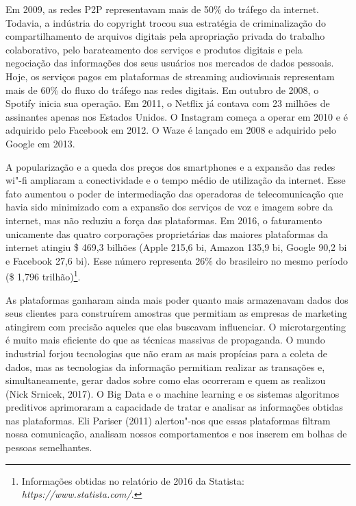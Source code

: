 Em 2009, as redes P2P representavam mais de 50\% do tráfego da internet.
Todavia, a indústria do copyright trocou sua estratégia de
criminalização do compartilhamento de arquivos digitais pela apropriação
privada do trabalho colaborativo, pelo barateamento dos serviços e
produtos digitais e pela negociação das informações dos seus usuários
nos mercados de dados pessoais. Hoje, os serviços pagos em plataformas
de streaming audiovisuais representam mais de 60\% do fluxo do tráfego
nas redes digitais. Em outubro de 2008, o Spotify inicia sua operação.
Em 2011, o Netflix já contava com 23 milhões de assinantes apenas nos
Estados Unidos. O Instagram começa a operar em 2010 e é adquirido pelo
Facebook em 2012. O Waze é lançado em 2008 e adquirido pelo Google em
2013.

A popularização e a queda dos preços dos smartphones e a expansão das
redes wi"-fi ampliaram a conectividade e o tempo médio de utilização da
internet. Esse fato aumentou o poder de intermediação das operadoras de
telecomunicação que havia sido minimizado com a expansão dos serviços de
voz e imagem sobre  da internet, mas não reduziu a força das
plataformas. Em 2016, o faturamento unicamente das quatro corporações
proprietárias das maiores plataformas da internet atingiu \$ 469,3
bilhões (Apple 215,6 bi, Amazon 135,9 bi, Google 90,2 bi e Facebook 27,6
bi). Esse número representa 26\% do  brasileiro no mesmo período
(\$ 1,796 trilhão)\footnote{Informações obtidas no relatório de 2016
  da Statista: \emph{https://www.statista.com/}.}.

As plataformas ganharam ainda mais poder quanto mais armazenavam dados
dos seus clientes para construírem amostras que permitiam as empresas de
marketing atingirem com precisão aqueles que elas buscavam influenciar.
O microtargenting é muito mais eficiente do que as técnicas massivas de
propaganda. O mundo industrial forjou tecnologias que não eram as mais
propícias para a coleta de dados, mas as tecnologias da informação
permitiam realizar as transações e, simultaneamente, gerar dados sobre
como elas ocorreram e quem as realizou (Nick Srnicek, 2017). O Big Data
e o machine learning e os sistemas algoritmos preditivos aprimoraram a
capacidade de tratar e analisar as informações obtidas nas plataformas.
Eli Pariser (2011) alertou"-nos que essas plataformas filtram nossa
comunicação, analisam nossos comportamentos e nos inserem em bolhas de
pessoas semelhantes.

